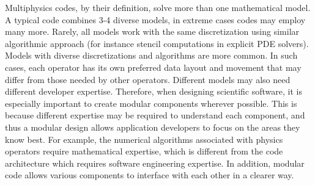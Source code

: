 \label{sec:domain-challenges}
Multiphysics codes, by their definition, solve more than one
mathematical model. A typical code combines 3-4
diverse models, in extreme cases codes may employ many more.
Rarely, all models work with the same
discretization using similar algorithmic approach (for instance
stencil computations in explicit PDE solvers).
Models with diverse discretizations and algorithms are more common. In
such cases, each operator has
its own preferred data layout and movement that may differ
from those needed by other operators. Different models may also need
different developer expertise. Therefore, when designing scientific software,
it is especially important to create  modular components wherever
possible.  This is because different expertise may be required to
understand each component, and thus a modular design allows
application developers to focus on the areas they know best. For
example, the numerical algorithms associated with physics operators
require mathematical expertise, which is different from the code
architecture which requires software engineering expertise. In
addition, modular code allows various components to interface with
each other in a clearer way.  %

